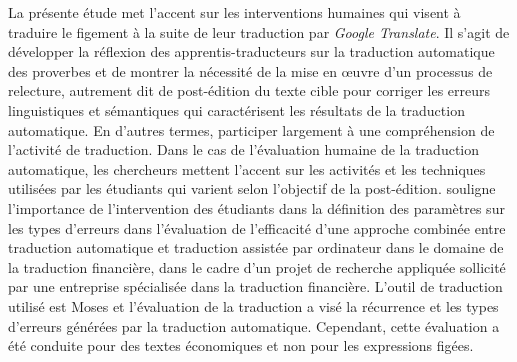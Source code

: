 \documentclass[french]{textolivre}
\begin{document}
La présente étude met l’accent sur les interventions humaines qui visent à traduire le figement à la suite de leur traduction par \textit{Google Translate}. Il s’agit de développer la réflexion des apprentis-traducteurs sur la traduction automatique des proverbes et de montrer la nécessité de la mise en œuvre d’un processus de relecture, autrement dit de post-édition du texte cible pour corriger les erreurs linguistiques et sémantiques qui caractérisent les résultats de la traduction automatique. En d’autres termes, participer largement à une compréhension de l’activité de traduction. Dans le cas de l’évaluation humaine de la traduction automatique, les chercheurs mettent l’accent sur les activités et les techniques utilisées par les étudiants qui varient selon l’objectif de la post-édition. \textcite{peraldi_traduction_2016} souligne l’importance de l’intervention des étudiants dans la définition des paramètres sur les types d’erreurs dans l’évaluation de l’efficacité d’une approche combinée entre traduction automatique et traduction assistée par ordinateur dans le domaine de la traduction financière, dans le cadre d’un projet de recherche appliquée sollicité par une entreprise spécialisée dans la traduction financière. L’outil de traduction utilisé est Moses et l’évaluation de la traduction a visé la récurrence et les types d’erreurs générées par la traduction automatique. Cependant, cette évaluation a été conduite pour des textes économiques et non pour les expressions figées.
\end{document}
